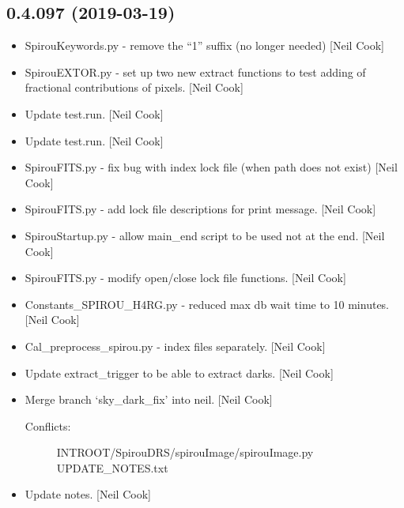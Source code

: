 \documentclass[a4paper,10pt,english]{report}
\begin{document}
\subsection{0.4.097 (2019-03-19)}
\label{\detokenize{misc/changelog:id161}}\begin{itemize}
\item {} 
SpirouKeywords.py - remove the “1” suffix (no longer needed) {[}Neil
Cook{]}

\item {} 
SpirouEXTOR.py - set up two new extract functions to test adding of
fractional contributions of pixels. {[}Neil Cook{]}

\item {} 
Update test.run. {[}Neil Cook{]}

\item {} 
Update test.run. {[}Neil Cook{]}

\item {} 
SpirouFITS.py - fix bug with index lock file (when path does not
exist) {[}Neil Cook{]}

\item {} 
SpirouFITS.py - add lock file descriptions for print message. {[}Neil
Cook{]}

\item {} 
SpirouStartup.py - allow main\_end script to be used not at the end.
{[}Neil Cook{]}

\item {} 
SpirouFITS.py - modify open/close lock file functions. {[}Neil Cook{]}

\item {} 
Constants\_SPIROU\_H4RG.py - reduced max db wait time to 10 minutes.
{[}Neil Cook{]}

\item {} 
Cal\_preprocess\_spirou.py - index files separately. {[}Neil Cook{]}

\item {} 
Update extract\_trigger to be able to extract darks. {[}Neil Cook{]}

\item {} 
Merge branch ‘sky\_dark\_fix’ into neil. {[}Neil Cook{]}
\begin{description}
\item[{Conflicts:}] \leavevmode
INTROOT/SpirouDRS/spirouImage/spirouImage.py
UPDATE\_NOTES.txt

\end{description}

\item {} 
Update notes. {[}Neil Cook{]}


\end{itemize}
\end{document}

